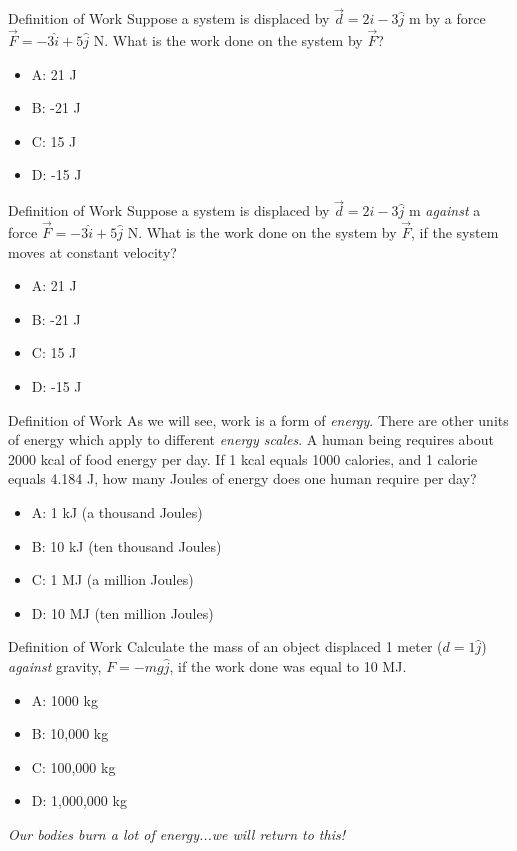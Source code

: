 \documentclass{beamer}
\begin{document}
\begin{frame}{Definition of Work}
Suppose a system is displaced by $\vec{d} = 2\hat{i}-3\hat{j}$ m by a force $\vec{F} = -3\hat{i}+5\hat{j}$ N.  What is the work done on the system by $\vec{F}$?
\begin{itemize}
\item A: 21 J
\item B: -21 J
\item C: 15 J
\item D: -15 J
\end{itemize}
\end{frame}

\begin{frame}{Definition of Work}
Suppose a system is displaced by $\vec{d} = 2\hat{i}-3\hat{j}$ m \textit{against} a force $\vec{F} = -3\hat{i}+5\hat{j}$ N.  What is the work done on the system by $\vec{F}$, if the system moves at constant velocity?
\begin{itemize}
\item A: 21 J
\item B: -21 J
\item C: 15 J
\item D: -15 J
\end{itemize}
\end{frame}

\begin{frame}{Definition of Work}
As we will see, work is a form of \textit{energy}.  There are other units of energy which apply to different \textit{energy scales}.  A human being requires about 2000 kcal of food energy per day.  If 1 kcal equals 1000 calories, and 1 calorie equals 4.184 J, how many Joules of energy does one human require per day?
\begin{itemize}
\item A: 1 kJ (a thousand Joules)
\item B: 10 kJ (ten thousand Joules)
\item C: 1 MJ (a million Joules)
\item D: 10 MJ (ten million Joules) 
\end{itemize}
\end{frame}

\begin{frame}{Definition of Work}
Calculate the mass of an object displaced 1 meter ($d = 1\hat{j}$) \textit{against} gravity, $F = -mg\hat{j}$, if the work done was equal to 10 MJ.
\begin{itemize}
\item A: 1000 kg
\item B: 10,000 kg
\item C: 100,000 kg
\item D: 1,000,000 kg
\end{itemize}
\textit{Our bodies burn a lot of energy...we will return to this!}
\end{frame}
\end{document}
